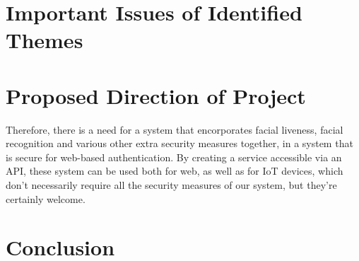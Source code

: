 \documentclass[14pt]{article}
\begin{document}
\section{Important Issues of Identified Themes}



\section{Proposed Direction of Project}
Therefore, there is a need for a system that encorporates facial liveness, facial recognition and various other
extra security measures together, in a system that is secure for web-based authentication. By creating a service
accessible via an API, these system can be used both for web, as well as for IoT devices, which don't necessarily require
all the security measures of our system, but they're certainly welcome.
\section{Conclusion}
\label{references}
\printbibliography
\end{document}
